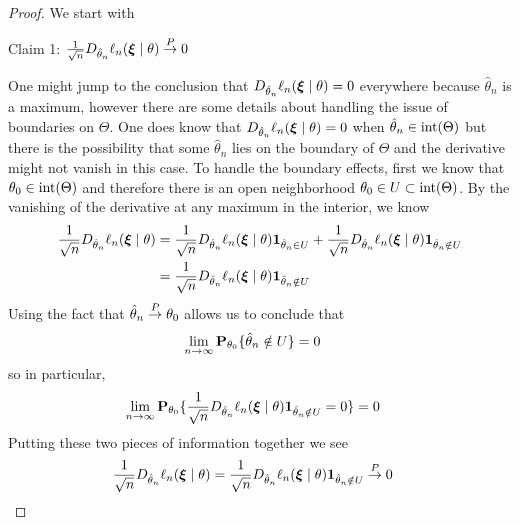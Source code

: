 \begin{proof}
We start with

Claim 1: $\frac{1}{\sqrt{n}} D_{\hat{\theta}_n} \ell_n(\sample{\xi} \mid \theta)
\toprob 0$

One might jump to the conclusion that $D_{\hat{\theta}_n} \ell_n(\sample{\xi}
\mid \theta) = 0$ everywhere because $\hat{\theta}_n$ is a maximum,
however there are some details about handling the issue of boundaries on
$\Theta$.  One does know that $D_{\hat{\theta}_n} \ell_n(
\sample{\xi} \mid \theta) = 0$ when $\hat{\theta}_n \in \interior(\Theta)$ but
there is the possibility that some $\hat{\theta}_n$ lies on the
boundary of $\Theta$ and the derivative might not vanish in this case.
To handle the boundary effects, first we know that $\theta_0 \in
\interior(\Theta)$  and therefore there is an open neighborhood
$\theta_0 \in U \subset \interior(\Theta)$.  By the vanishing of the
derivative at any maximum in the interior, we know
\begin{align*}
\frac{1}{\sqrt{n}} D_{\hat{\theta}_n} \ell_n(\sample{\xi} \mid \theta) &=
\frac{1}{\sqrt{n}} D_{\hat{\theta}_n} \ell_n(\sample{\xi} \mid \theta)
\characteristic{\hat{\theta}_n  \in U} + \frac{1}{\sqrt{n}} D_{\hat{\theta}_n} \ell_n(\sample{\xi} \mid \theta)
\characteristic{\hat{\theta}_n  \notin U} \\
&= \frac{1}{\sqrt{n}} D_{\hat{\theta}_n} \ell_n(\sample{\xi} \mid \theta)
\characteristic{\hat{\theta}_n  \notin U}
\end{align*}
Using the fact that $\hat{\theta}_n \toprob
\theta_0$ allows us to conclude that 
\begin{align*}
\lim_{n \to \infty} \sprobability{\hat{\theta}_n  \notin U}{\theta_0} &= 0
\end{align*}
so in particular,
\begin{align*}
\lim_{n \to \infty} \sprobability{ \frac{1}{\sqrt{n}} D_{\hat{\theta}_n} \ell_n(\sample{\xi}
  \mid \theta) \characteristic{\hat{\theta}_n  \notin U} = 0}{\theta_0} &=0
\end{align*}
Putting these two pieces of information together we see
\begin{align*}
 \frac{1}{\sqrt{n}} D_{\hat{\theta}_n} \ell_n(\sample{\xi} \mid \theta) &=
 \frac{1}{\sqrt{n}} D_{\hat{\theta}_n} \ell_n(\sample{\xi} \mid \theta)
\characteristic{\hat{\theta}_n  \notin U} \toprob 0
\end{align*}


\end{proof}
